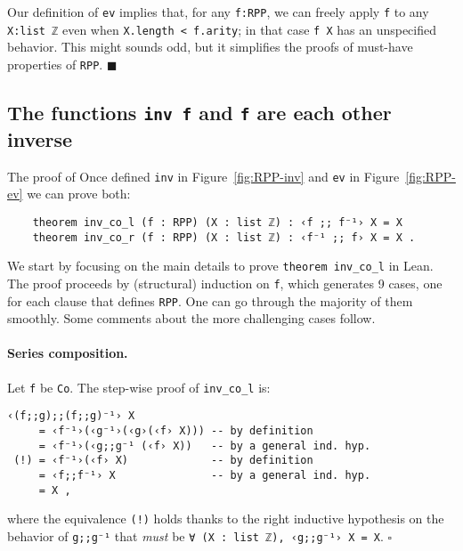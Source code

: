 \documentclass[runningheads]{llncs}
\newcommand*{\qeda}{\hfill\ensuremath{\blacksquare}}%
\newcommand*{\qedb}{\hfill\ensuremath{\square}}%
\newcommand{\LEAN}{\textsf{Lean}\xspace}
\begin{document}
\begin{remark}
\label{remark:We keep the definition of ev simple}
Our definition of \lstinline|ev| implies that, for any \lstinline|f:RPP|, we can freely apply \lstinline|f| to any \lstinline|X:list ℤ| even when \lstinline|X.length < f.arity|; in that case \lstinline|f X| has an unspecified behavior. This might sounds odd, but it simplifies the proofs of must-have properties of \lstinline|RPP|.
\qeda
\end{remark}

\subsection{The functions {\normalfont \lstinline|inv f|} and {\normalfont \lstinline|f|} are each other inverse}
The proof of
Once defined \lstinline|inv| in Figure~\ref{fig:RPP-inv} and \lstinline|ev| in Figure~\ref{fig:RPP-ev} we can prove both:
\begin{lstlisting}
    theorem inv_co_l (f : RPP) (X : list ℤ) : ‹f ;; f⁻¹› X = X
    theorem inv_co_r (f : RPP) (X : list ℤ) : ‹f⁻¹ ;; f› X = X .
\end{lstlisting}
We start by focusing on the main details to prove \lstinline|theorem inv_co_l| in \LEAN. The proof proceeds by (structural) induction on \lstinline|f|, which generates 9 cases, one for each clause that defines \lstinline|RPP|. One can go through the majority of them smoothly.
Some comments about the more challenging cases follow.

\paragraph{Series composition.} Let \lstinline|f| be \lstinline|Co|. The step-wise proof of \lstinline|inv_co_l| is:
\begin{lstlisting}
‹(f;;g);;(f;;g)⁻¹› X
     = ‹f⁻¹›(‹g⁻¹›(‹g›(‹f› X))) -- by definition
     = ‹f⁻¹›(‹g;;g⁻¹ (‹f› X))   -- by a general ind. hyp.
 (!) = ‹f⁻¹›(‹f› X)             -- by definition
     = ‹f;;f⁻¹› X               -- by a general ind. hyp.
     = X ,
\end{lstlisting}
where the equivalence \lstinline|(!)| holds thanks to the right inductive hypothesis on the behavior of \lstinline|g;;g⁻¹| that \emph{must} be
\lstinline|∀ (X : list ℤ), ‹g;;g⁻¹› X = X|.
\qedb
\end{document}
